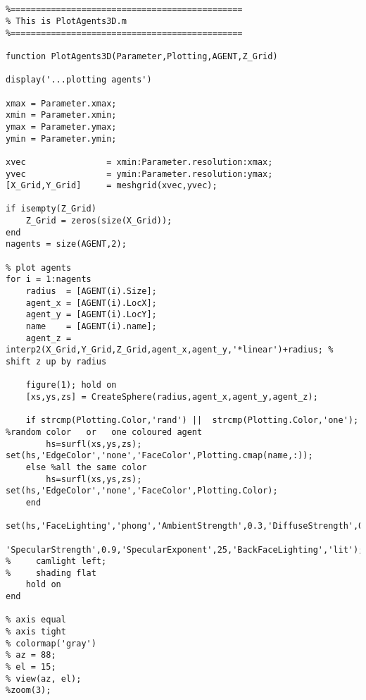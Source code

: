 \lstset{basicstyle=\footnotesize\ttfamily}
    
\begin{lstlisting}[breaklines]


%==============================================
% This is PlotAgents3D.m
%==============================================

function PlotAgents3D(Parameter,Plotting,AGENT,Z_Grid)

display('...plotting agents')

xmax = Parameter.xmax;
xmin = Parameter.xmin;
ymax = Parameter.ymax;
ymin = Parameter.ymin;

xvec                = xmin:Parameter.resolution:xmax;
yvec                = ymin:Parameter.resolution:ymax;
[X_Grid,Y_Grid]     = meshgrid(xvec,yvec);

if isempty(Z_Grid)
    Z_Grid = zeros(size(X_Grid));
end
nagents = size(AGENT,2);

% plot agents
for i = 1:nagents
    radius  = [AGENT(i).Size];
    agent_x	= [AGENT(i).LocX];
    agent_y	= [AGENT(i).LocY];
    name    = [AGENT(i).name];
    agent_z = interp2(X_Grid,Y_Grid,Z_Grid,agent_x,agent_y,'*linear')+radius; % shift z up by radius
    
    figure(1); hold on
    [xs,ys,zs] = CreateSphere(radius,agent_x,agent_y,agent_z);
    
    if strcmp(Plotting.Color,'rand') ||  strcmp(Plotting.Color,'one'); %random color   or   one coloured agent
        hs=surfl(xs,ys,zs); set(hs,'EdgeColor','none','FaceColor',Plotting.cmap(name,:));
    else %all the same color
        hs=surfl(xs,ys,zs); set(hs,'EdgeColor','none','FaceColor',Plotting.Color);
    end
    set(hs,'FaceLighting','phong','AmbientStrength',0.3,'DiffuseStrength',0.8,...
        'SpecularStrength',0.9,'SpecularExponent',25,'BackFaceLighting','lit');
%     camlight left;
%     shading flat
    hold on
end

% axis equal
% axis tight
% colormap('gray')
% az = 88;
% el = 15;
% view(az, el);
%zoom(3);


\end{lstlisting}